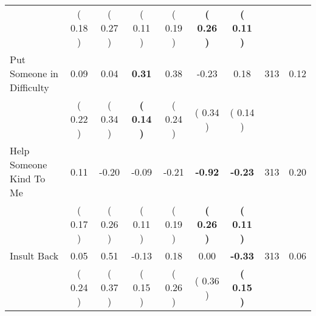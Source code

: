\begin{tabular}{lcccccccc}
 & (     0.18 ) & (     0.27 ) & (     0.11 ) & (     0.19 ) & \textbf{(     0.26 )} & \textbf{(     0.11 )} & \\
Put Someone in Difficulty &      0.09 &      0.04 & \textbf{     0.31} &      0.38 &     -0.23 &      0.18 & 313 &       0.12 \\ 
 & (     0.22 ) & (     0.34 ) & \textbf{(     0.14 )} & (     0.24 ) & (     0.34 ) & (     0.14 ) & \\
Help Someone Kind To Me &      0.11 &     -0.20 &     -0.09 &     -0.21 & \textbf{    -0.92} & \textbf{    -0.23} & 313 &       0.20 \\ 
 & (     0.17 ) & (     0.26 ) & (     0.11 ) & (     0.19 ) & \textbf{(     0.26 )} & \textbf{(     0.11 )} & \\
Insult Back &      0.05 &      0.51 &     -0.13 &      0.18 &      0.00 & \textbf{    -0.33} & 313 &       0.06 \\ 
 & (     0.24 ) & (     0.37 ) & (     0.15 ) & (     0.26 ) & (     0.36 ) & \textbf{(     0.15 )} & \\
\bottomrule
\end{tabular}
